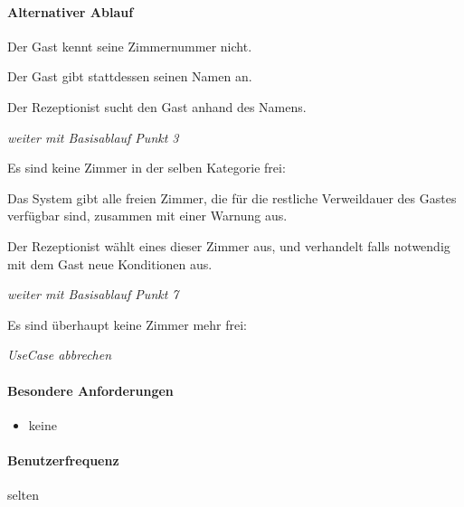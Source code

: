 \paragraph{Alternativer Ablauf}
\begin{longenum}
	\item
	\item
	\begin{longenum}
		\item Der \Gls{Gast} kennt seine \Gls{Zimmernummer} nicht.
		\begin{longenum}
			\item Der \Gls{Gast} gibt stattdessen seinen Namen an.
			\item Der \Gls{Rezeptionist} sucht den \Gls{Gast} anhand des Namens.
			\item \emph{weiter mit Basisablauf Punkt 3}
		\end{longenum}
	\end{longenum}
	\item
	\item
	\item
	\begin{longenum}
		\item Es sind keine \Gls{Zimmer} in der selben Kategorie frei:
		\begin{longenum}
			\item Das System gibt alle freien \Gls{Zimmer}, die für die restliche Verweildauer des \Gls{Gast}es verfügbar sind, zusammen mit einer Warnung aus.
			\item Der \Gls{Rezeptionist} wählt eines dieser \Gls{Zimmer} aus, und verhandelt falls notwendig mit dem \Gls{Gast} neue Konditionen aus.
			\item \emph{weiter mit Basisablauf Punkt 7}
		\end{longenum}
		\item Es sind überhaupt keine \Gls{Zimmer} mehr frei:
		\begin{longenum}
			\item \emph{UseCase abbrechen}
		\end{longenum}
	\end{longenum}
	\item
	\item
\end{longenum}

\paragraph{Besondere Anforderungen}
\begin{itemize}
	\item keine
\end{itemize}

\paragraph{Benutzerfrequenz}
selten

\newpage
